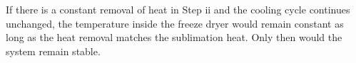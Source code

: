 If there is a constant removal of heat in Step ii and the cooling cycle continues unchanged, the temperature inside the freeze dryer would remain constant as long as the heat removal matches the sublimation heat. Only then would the system remain stable.
